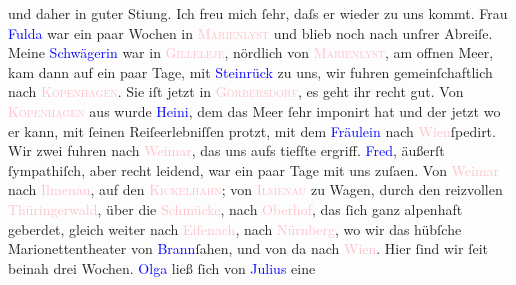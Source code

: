                und daher in guter Sti{\geminationm}ung. Ich freu mich ſehr, daſs er
               wieder zu uns kommt. Frau \textcolor{blue}{Fulda}{}\ledrightnote{\textcolor{blue}{Ida d’Albert}} war ein paar
               Wochen in \textcolor{pink}{\textsc{Marienlyst}}{}\ledrightnote{\textcolor{pink}{Marienlyst}} und
               blieb noch nach unſrer Abreiſe. {\pb}Meine \textcolor{blue}{Schwägerin}{} war in \textcolor{pink}{\textsc{Gilleleje}}{}\ledrightnote{\textcolor{pink}{Gilleleje}}, nördlich von \textcolor{pink}{\textsc{Marienlyst}}{}\ledrightnote{\textcolor{pink}{Marienlyst}}, am offnen Meer, kam dann
               auf ein paar Tage, mit \textcolor{blue}{Steinrück}{}\ledrightnote{\textcolor{blue}{Albert Steinrück}} zu uns, wir
               fuhren gemeinſchaftlich nach \textsc{\textcolor{pink}{Kopenhagen}{}\ledrightnote{\textcolor{pink}{Kopenhagen}}}. Sie iſt jetzt in \textcolor{pink}{\textsc{Görbersdorf}}{}\ledrightnote{\textcolor{pink}{Görbersdorf}}, es geht ihr recht gut. Von \textcolor{pink}{\textsc{Kopenhagen}}{}\ledrightnote{\textcolor{pink}{Kopenhagen}} aus wurde \textcolor{blue}{Heini}{}\ledrightnote{\textcolor{blue}{Heinrich Schnitzler}}, dem das Meer ſehr imponirt hat und der
               jetzt wo er kann, mit ſeinen Reiſeerlebniſſen protzt, mit dem \textcolor{blue}{Fräulein}{} nach \textcolor{pink}{Wien}{}\ledrightnote{\textcolor{pink}{Wien}}{ }ſpedirt. Wir zwei fuhren nach \textcolor{pink}{Weimar}{}\ledrightnote{\textcolor{pink}{Weimar}}, das uns aufs tiefſte ergriff. \textcolor{blue}{Fred}{}\ledrightnote{\textcolor{blue}{W. Fred}}, äußerſt ſympathiſch, aber recht leidend, war ein paar
               Tage mit uns zuſa{\geminationm}en. Von \textcolor{pink}{Weimar}{}\ledrightnote{\textcolor{pink}{Weimar}} nach \textcolor{pink}{Ilmenau}{}\ledrightnote{\textcolor{pink}{Ilmenau}}, auf den \textcolor{pink}{\textsc{Kickelhahn}}{}\ledrightnote{\textcolor{pink}{Kickelhahn}}; von \textcolor{pink}{\textsc{Ilmenau}}{}\ledrightnote{\textcolor{pink}{Ilmenau}} zu Wagen, {\pb}durch den reizvollen \textcolor{pink}{Thüringerwald}{}\ledrightnote{\textcolor{pink}{Thüringer Wald}}, über die \textcolor{pink}{Schmücke}{}\ledrightnote{\textcolor{pink}{Schmücke}}, nach
                  \textcolor{pink}{Oberhof}{}\ledrightnote{\textcolor{pink}{Oberhof}}, das ſich ganz alpenhaft geberdet,
               gleich weiter nach \textcolor{pink}{Eiſenach}{}\ledrightnote{\textcolor{pink}{Eisenach}}, nach \textcolor{pink}{Nürnberg}{}\ledrightnote{\textcolor{pink}{Nürnberg}}, wo wir das hübſche Marionettentheater von \textcolor{blue}{Brann}{}\ledrightnote{\textcolor{blue}{Paul Brann}}{ }ſahen, und von da nach \textcolor{pink}{Wien}{}\ledrightnote{\textcolor{pink}{Wien}}. Hier ſind wir ſeit beinah drei Wochen. \textcolor{blue}{Olga}{}\ledrightnote{\textcolor{blue}{Olga Schnitzler}} ließ ſich von \textcolor{blue}{Julius}{}\ledrightnote{\textcolor{blue}{Julius Schnitzler}} eine
